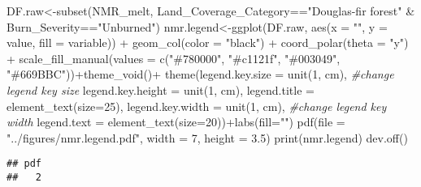 \documentclass[
]{article}
\newenvironment{Shaded}{\begin{snugshade}}{\end{snugshade}}
\newcommand{\AttributeTok}[1]{\textcolor[rgb]{0.77,0.63,0.00}{#1}}
\newcommand{\CommentTok}[1]{\textcolor[rgb]{0.56,0.35,0.01}{\textit{#1}}}
\newcommand{\DecValTok}[1]{\textcolor[rgb]{0.00,0.00,0.81}{#1}}
\newcommand{\FloatTok}[1]{\textcolor[rgb]{0.00,0.00,0.81}{#1}}
\newcommand{\FunctionTok}[1]{\textcolor[rgb]{0.00,0.00,0.00}{#1}}
\newcommand{\NormalTok}[1]{#1}
\newcommand{\OtherTok}[1]{\textcolor[rgb]{0.56,0.35,0.01}{#1}}
\newcommand{\SpecialCharTok}[1]{\textcolor[rgb]{0.00,0.00,0.00}{#1}}
\newcommand{\StringTok}[1]{\textcolor[rgb]{0.31,0.60,0.02}{#1}}
\begin{document}
\begin{Shaded}
\begin{Highlighting}[]
\NormalTok{DF.raw}\OtherTok{\textless{}{-}}\FunctionTok{subset}\NormalTok{(NMR\_melt, Land\_Coverage\_Category}\SpecialCharTok{==}\StringTok{"Douglas{-}fir forest"} \SpecialCharTok{\&}\NormalTok{ Burn\_Severity}\SpecialCharTok{==}\StringTok{"Unburned"}\NormalTok{)}
\NormalTok{nmr.legend}\OtherTok{\textless{}{-}}\FunctionTok{ggplot}\NormalTok{(DF.raw, }\FunctionTok{aes}\NormalTok{(}\AttributeTok{x =} \StringTok{""}\NormalTok{, }\AttributeTok{y =}\NormalTok{ value, }\AttributeTok{fill =}\NormalTok{ variable)) }\SpecialCharTok{+}
    \FunctionTok{geom\_col}\NormalTok{(}\AttributeTok{color =} \StringTok{"black"}\NormalTok{) }\SpecialCharTok{+}
    \FunctionTok{coord\_polar}\NormalTok{(}\AttributeTok{theta =} \StringTok{"y"}\NormalTok{) }\SpecialCharTok{+} \FunctionTok{scale\_fill\_manual}\NormalTok{(}\AttributeTok{values =} \FunctionTok{c}\NormalTok{(}\StringTok{"\#780000"}\NormalTok{, }\StringTok{"\#c1121f"}\NormalTok{, }\StringTok{"\#003049"}\NormalTok{, }\StringTok{"\#669BBC"}\NormalTok{))}\SpecialCharTok{+}\FunctionTok{theme\_void}\NormalTok{()}\SpecialCharTok{+}
    \FunctionTok{theme}\NormalTok{(}\AttributeTok{legend.key.size =} \FunctionTok{unit}\NormalTok{(}\DecValTok{1}\NormalTok{, }\StringTok{\textquotesingle{}cm\textquotesingle{}}\NormalTok{), }\CommentTok{\#change legend key size}
          \AttributeTok{legend.key.height =} \FunctionTok{unit}\NormalTok{(}\DecValTok{1}\NormalTok{, }\StringTok{\textquotesingle{}cm\textquotesingle{}}\NormalTok{),  }\AttributeTok{legend.title =} \FunctionTok{element\_text}\NormalTok{(}\AttributeTok{size=}\DecValTok{25}\NormalTok{),}
          \AttributeTok{legend.key.width =} \FunctionTok{unit}\NormalTok{(}\DecValTok{1}\NormalTok{, }\StringTok{\textquotesingle{}cm\textquotesingle{}}\NormalTok{), }\CommentTok{\#change legend key width}
          \AttributeTok{legend.text =} \FunctionTok{element\_text}\NormalTok{(}\AttributeTok{size=}\DecValTok{20}\NormalTok{))}\SpecialCharTok{+}\FunctionTok{labs}\NormalTok{(}\AttributeTok{fill=}\StringTok{""}\NormalTok{)}
\FunctionTok{pdf}\NormalTok{(}\AttributeTok{file =} \StringTok{"../figures/nmr.legend.pdf"}\NormalTok{, }\AttributeTok{width =} \DecValTok{7}\NormalTok{, }\AttributeTok{height =} \FloatTok{3.5}\NormalTok{) }
\FunctionTok{print}\NormalTok{(nmr.legend)}
\FunctionTok{dev.off}\NormalTok{()}
\end{Highlighting}
\end{Shaded}

\begin{verbatim}
## pdf 
##   2
\end{verbatim}
\end{document}
